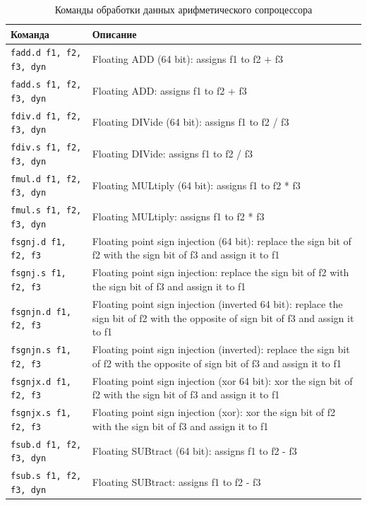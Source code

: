 \begin{table}[h]
    \caption{Команды обработки данных арифметического сопроцессора}
    \centering
    \begin{tabularx}{\textwidth}{|l|X|}
        \hline
        \textbf{Команда} & \textbf{Описание} \\
        \hline \verb|fadd.d f1, f2, f3, dyn| & Floating ADD (64 bit): assigns f1 to f2 + f3 \\
        \hline \verb|fadd.s f1, f2, f3, dyn| & Floating ADD: assigns f1 to f2 + f3 \\
        \hline \verb|fdiv.d f1, f2, f3, dyn| & Floating DIVide (64 bit): assigns f1 to f2 / f3 \\
        \hline \verb|fdiv.s f1, f2, f3, dyn| & Floating DIVide: assigns f1 to f2 / f3 \\
        \hline \verb|fmul.d f1, f2, f3, dyn| & Floating MULtiply (64 bit): assigns f1 to f2 * f3 \\
        \hline \verb|fmul.s f1, f2, f3, dyn| & Floating MULtiply: assigns f1 to f2 * f3 \\
        \hline \verb|fsgnj.d f1, f2, f3| & Floating point sign injection (64 bit): replace the sign bit of f2 with the sign bit of f3 and assign it to f1 \\
        \hline \verb|fsgnj.s f1, f2, f3| & Floating point sign injection: replace the sign bit of f2 with the sign bit of f3 and assign it to f1 \\
        \hline \verb|fsgnjn.d f1, f2, f3| & Floating point sign injection (inverted 64 bit):  replace the sign bit of f2 with the opposite of sign bit of f3 and assign it to f1 \\
        \hline \verb|fsgnjn.s f1, f2, f3| & Floating point sign injection (inverted):  replace the sign bit of f2 with the opposite of sign bit of f3 and assign it to f1 \\
        \hline \verb|fsgnjx.d f1, f2, f3| & Floating point sign injection (xor 64 bit):  xor the sign bit of f2 with the sign bit of f3 and assign it to f1 \\
        \hline \verb|fsgnjx.s f1, f2, f3| & Floating point sign injection (xor):  xor the sign bit of f2 with the sign bit of f3 and assign it to f1 \\
        \hline \verb|fsub.d f1, f2, f3, dyn| & Floating SUBtract (64 bit): assigns f1 to f2 - f3 \\
        \hline \verb|fsub.s f1, f2, f3, dyn| & Floating SUBtract: assigns f1 to f2 - f3 \\
        \hline
    \end{tabularx}
    \label{table-fp-processor-calc}
\end{table}

